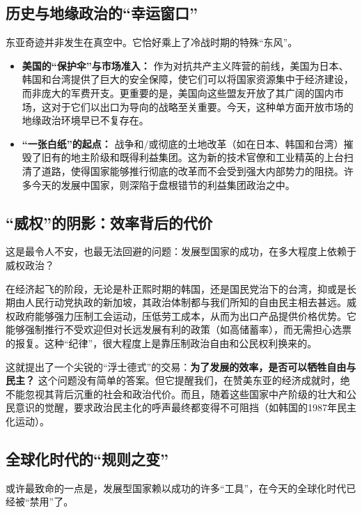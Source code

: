\documentclass[a5paper, 11pt, openany]{ctexbook}
\begin{document}
\subsection{历史与地缘政治的“幸运窗口”}

东亚奇迹并非发生在真空中。它恰好乘上了冷战时期的特殊“东风”。
\begin{itemize}
    \item \textbf{美国的“保护伞”与市场准入：} 作为对抗共产主义阵营的前线，美国为日本、韩国和台湾提供了巨大的安全保障，使它们可以将国家资源集中于经济建设，而非庞大的军费开支。更重要的是，美国向这些盟友开放了其广阔的国内市场，这对于它们以出口为导向的战略至关重要。今天，这种单方面开放市场的地缘政治环境早已不复存在。
    \item \textbf{“一张白纸”的起点：} 战争和/或彻底的土地改革（如在日本、韩国和台湾）摧毁了旧有的地主阶级和既得利益集团。这为新的技术官僚和工业精英的上台扫清了道路，使得国家能够推行彻底的改革而不会受到强大内部势力的阻挠。许多今天的发展中国家，则深陷于盘根错节的利益集团政治之中。
\end{itemize}

\subsection{“威权”的阴影：效率背后的代价}

这是最令人不安，也最无法回避的问题：发展型国家的成功，在多大程度上依赖于威权政治？

在经济起飞的阶段，无论是朴正熙时期的韩国，还是国民党治下的台湾，抑或是长期由人民行动党执政的新加坡，其政治体制都与我们所知的自由民主相去甚远。威权政府能够强力压制工会运动，压低劳工成本，从而为出口产品提供价格优势。它能够强制推行不受欢迎但对长远发展有利的政策（如高储蓄率），而无需担心选票的报复。这种“纪律”，很大程度上是靠压制政治自由和公民权利换来的。

这就提出了一个尖锐的“浮士德式”的交易：\textbf{为了发展的效率，是否可以牺牲自由与民主？} 这个问题没有简单的答案。但它提醒我们，在赞美东亚的经济成就时，绝不能忽视其背后沉重的社会和政治代价。而且，随着这些国家中产阶级的壮大和公民意识的觉醒，要求政治民主化的呼声最终都变得不可阻挡（如韩国的1987年民主化运动）。

\subsection{全球化时代的“规则之变”}

或许最致命的一点是，发展型国家赖以成功的许多“工具”，在今天的全球化时代已经被“禁用”了。
\end{document}
